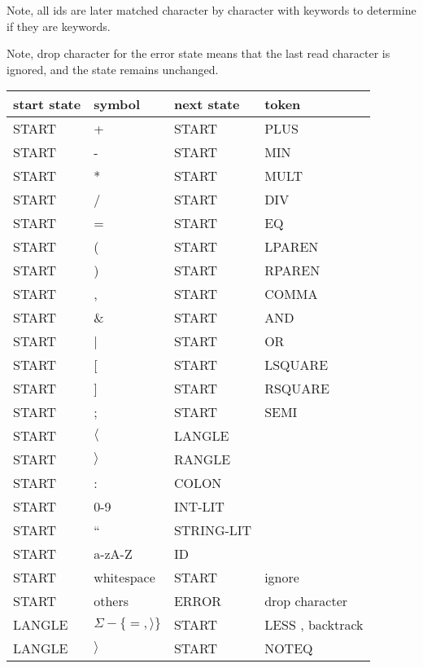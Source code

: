 \documentclass[11pt, fleqn]{article}
\begin{document}
Note, all ids are later matched character by character with keywords to determine if they are keywords.

Note, drop character for the error state means that the last read character is ignored, and the state remains unchanged.

\begin{tabular}{l|l|l|l}
start state		&	symbol						&	next	 state		&	token		 		\\
\hline
START			&	+								&	START			&	PLUS					\\
START			&	-								&	START			&	MIN					\\
START			&	*								&	START			&	MULT					\\
START			&	/								&	START			&	DIV					\\
START			&	=								&	START			&	EQ					\\
START			&	(								&	START			&	LPAREN				\\
START			&	)								&	START			&	RPAREN				\\
START			&	,								&	START			&	COMMA				\\
START			&	\&								&	START			&	AND					\\
START			&	|								&	START			&	OR					\\
START			&	[								&	START			&	LSQUARE				\\
START			&	]								&	START			&	RSQUARE				\\
START			&	;								&	START			&	SEMI					\\
START			&	$\langle$						&	LANGLE			&						\\
START			&	$\rangle$						&	RANGLE			&						\\
START			&	:								&	COLON			&						\\
START			&	0-9								&	INT-LIT			&						\\
START			&	``								&	STRING-LIT		&						\\
START			&	a-zA-Z							&	ID				&						\\
START			&	whitespace						&	START			&	ignore				\\
START			&	others							&	ERROR			&	drop character		\\
LANGLE			&	$\Sigma - \{=, \rangle\}$		&	START			&	LESS	, backtrack		\\
LANGLE			&	$\rangle$						&	START			&	NOTEQ				\\

\end{tabular}
\end{document}
